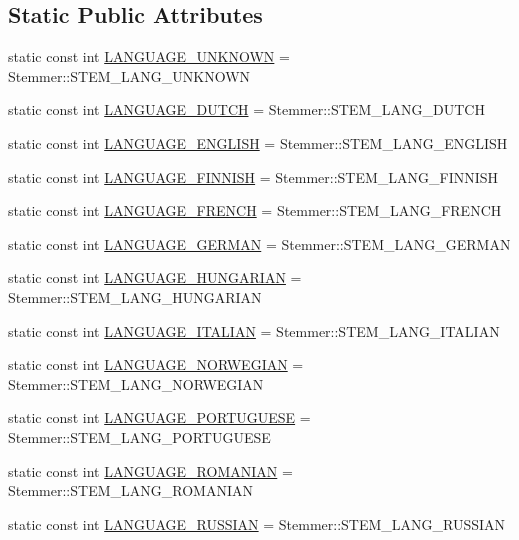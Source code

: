 \subsection*{Static Public Attributes}
\begin{CompactItemize}
\item 
static const int \hyperlink{classla__manager_1_1LAConfiguration_a985c82a8f9c025137bded214ec9cd13}{LANGUAGE\_\-UNKNOWN} = Stemmer::STEM\_\-LANG\_\-UNKNOWN
\item 
static const int \hyperlink{classla__manager_1_1LAConfiguration_6e4734d71a49f6a79190dd9bcaa482fc}{LANGUAGE\_\-DUTCH} = Stemmer::STEM\_\-LANG\_\-DUTCH
\item 
static const int \hyperlink{classla__manager_1_1LAConfiguration_6da3eb83fc013880eecb635178f0631a}{LANGUAGE\_\-ENGLISH} = Stemmer::STEM\_\-LANG\_\-ENGLISH
\item 
static const int \hyperlink{classla__manager_1_1LAConfiguration_d4b37020e4318e3afce31fbbe993f74d}{LANGUAGE\_\-FINNISH} = Stemmer::STEM\_\-LANG\_\-FINNISH
\item 
static const int \hyperlink{classla__manager_1_1LAConfiguration_b2dce069bbee79d19e35cbfd624d7078}{LANGUAGE\_\-FRENCH} = Stemmer::STEM\_\-LANG\_\-FRENCH
\item 
static const int \hyperlink{classla__manager_1_1LAConfiguration_6443ae7996afe191eff4dffeeba61468}{LANGUAGE\_\-GERMAN} = Stemmer::STEM\_\-LANG\_\-GERMAN
\item 
static const int \hyperlink{classla__manager_1_1LAConfiguration_8bfd78dc7c3c226c23ec70b90850c84c}{LANGUAGE\_\-HUNGARIAN} = Stemmer::STEM\_\-LANG\_\-HUNGARIAN
\item 
static const int \hyperlink{classla__manager_1_1LAConfiguration_d1fdc7507060f8bb4aa564968c5ceeed}{LANGUAGE\_\-ITALIAN} = Stemmer::STEM\_\-LANG\_\-ITALIAN
\item 
static const int \hyperlink{classla__manager_1_1LAConfiguration_a3aaa794eb886307ff56c15ccbd0447a}{LANGUAGE\_\-NORWEGIAN} = Stemmer::STEM\_\-LANG\_\-NORWEGIAN
\item 
static const int \hyperlink{classla__manager_1_1LAConfiguration_886b546adfed6958a82b427545b7d91a}{LANGUAGE\_\-PORTUGUESE} = Stemmer::STEM\_\-LANG\_\-PORTUGUESE
\item 
static const int \hyperlink{classla__manager_1_1LAConfiguration_badd19034cd02a738ab488e2f588a31a}{LANGUAGE\_\-ROMANIAN} = Stemmer::STEM\_\-LANG\_\-ROMANIAN
\item 
static const int \hyperlink{classla__manager_1_1LAConfiguration_391aade71f995d9f4e09e50a341c3cbf}{LANGUAGE\_\-RUSSIAN} = Stemmer::STEM\_\-LANG\_\-RUSSIAN

\end{CompactItemize}
